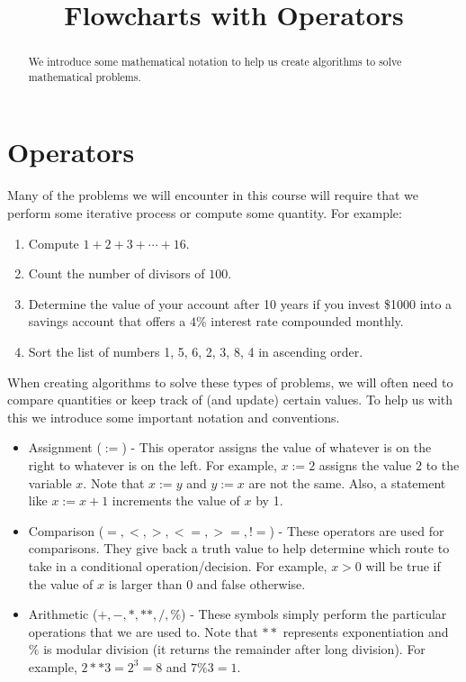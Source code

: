 \documentclass{ximera}
\title{Flowcharts with Operators}
\begin{document}
  
\begin{abstract}  
We introduce some mathematical notation to help us create algorithms to solve mathematical problems. 
\end{abstract}  
\maketitle

\section{Operators}
Many of the problems we will encounter in this course will require that we perform some iterative process or compute some quantity. For example:

\begin{enumerate}
	\item Compute $1+2+3+\cdots+16$.
	\item Count the number of divisors of $100$.
	\item Determine the value of your account after 10 years if you invest \$1000 into a savings account that offers a $4$\% interest rate compounded monthly.
	\item Sort the list of numbers 1, 5, 6, 2, 3, 8, 4 in ascending order.
\end{enumerate}

When creating algorithms to solve these types of problems, we will often need to compare quantities or keep track of (and update) certain values. To help us with this we introduce some important notation and conventions.

\begin{itemize}
	\item Assignment ($:=$) - This operator assigns the value of whatever is on the right to whatever is on the left. For example, $x:=2$ assigns the value $2$ to the variable $x$. Note that $x:=y$ and $y:=x$ are not the same. Also, a statement like $x:=x+1$ increments the value of $x$ by 1.
	\item Comparison ($=,<,>,<=,>=,!=$) - These operators are used for comparisons. They give back a truth value to help determine which route to take in a conditional operation/decision. For example, $x>0$ will be true if the value of $x$ is larger than $0$ and false otherwise.
	\item Arithmetic ($+,-,*,**,/,\%$) - These symbols simply perform the particular operations that we are used to. Note that $**$ represents exponentiation and $\%$ is modular division (it returns the remainder after long division). For example, $2**3 = 2^3 = 8$ and $7\%3 = 1$.
\end{itemize}
\end{document}

